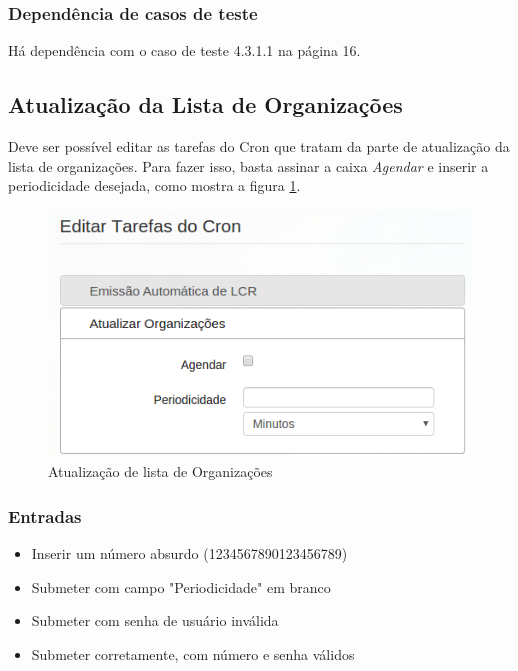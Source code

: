 \subsubsection{Dependência de casos de teste}
Há dependência com o caso de teste 4.3.1.1 na página 16.

\subsection{Atualização da Lista de Organizações}

Deve ser possível editar as tarefas do Cron que tratam da parte de atualização da lista de organizações. Para fazer isso, basta assinar a caixa \textit{Agendar} e inserir a periodicidade desejada, como mostra a figura \ref{fig:croncert}.

\begin{figure}[ht]
     \centering
     \includegraphics[scale=0.5]{images/saec21cron.png}
     \caption{Atualização de lista de Organizações}
     \label{fig:croncert}
\end{figure}

\subsubsection{Entradas}

\begin{itemize}

	\item Inserir um número absurdo (1234567890123456789)
	\item Submeter com campo "Periodicidade" em branco
	\item Submeter com senha de usuário inválida
	\item Submeter corretamente, com número e senha válidos
	
\end{itemize}

